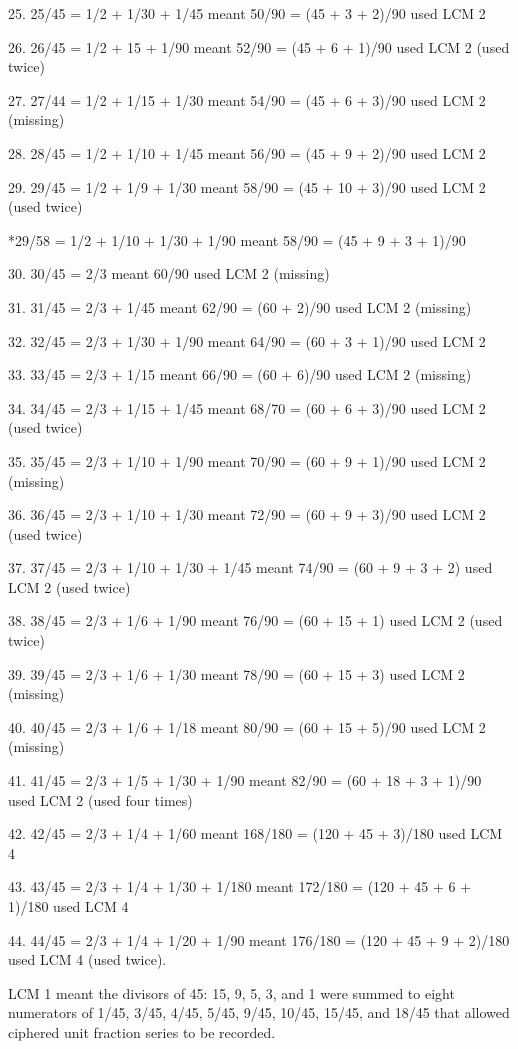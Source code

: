 \documentclass[12pt]{article}
\begin{document}
25. 25/45 = 1/2 + 1/30 + 1/45 meant 50/90 = (45 + 3 + 2)/90 used LCM 2

26. 26/45 = 1/2 + 15 + 1/90 meant 52/90 = (45 + 6 + 1)/90 used LCM 2 (used twice)

27. 27/44 = 1/2 + 1/15 + 1/30 meant 54/90 = (45 + 6 + 3)/90 used LCM 2 (missing)

28. 28/45  = 1/2 + 1/10 + 1/45 meant 56/90 = (45 + 9 + 2)/90 used LCM 2

29. 29/45 = 1/2 + 1/9 + 1/30 meant 58/90 = (45 + 10 + 3)/90 used LCM 2 (used twice)

*29/58 = 1/2 + 1/10 + 1/30 + 1/90 meant 58/90 = (45 + 9 + 3 + 1)/90

30. 30/45 = 2/3 meant 60/90 used LCM 2  (missing)

31. 31/45 = 2/3 + 1/45 meant 62/90 = (60 + 2)/90 used LCM 2 (missing)

32. 32/45 = 2/3 + 1/30 + 1/90 meant 64/90 = (60 + 3 + 1)/90 used LCM 2

33. 33/45 = 2/3 + 1/15  meant 66/90 = (60 + 6)/90 used LCM 2 (missing)

34. 34/45 = 2/3 + 1/15 + 1/45 meant 68/70 = (60 + 6 + 3)/90 used LCM 2 (used twice) 

35. 35/45 = 2/3 + 1/10 + 1/90 meant 70/90 = (60 + 9 + 1)/90 used LCM 2 (missing)

36. 36/45 = 2/3 + 1/10 + 1/30 meant 72/90 = (60 + 9 + 3)/90 used LCM 2 (used twice)

37. 37/45 = 2/3 + 1/10 + 1/30 + 1/45 meant 74/90 = (60 + 9 + 3 + 2) used LCM 2 (used twice)

38. 38/45 = 2/3 + 1/6 + 1/90 meant 76/90 = (60 + 15 + 1) used LCM 2 (used twice)

39. 39/45 = 2/3 + 1/6 + 1/30 meant 78/90 = (60 + 15 + 3) used LCM 2 (missing)

40. 40/45 = 2/3 + 1/6 + 1/18 meant 80/90 = (60 + 15 + 5)/90 used LCM 2 (missing)

41. 41/45 = 2/3 + 1/5 + 1/30 + 1/90 meant 82/90 = (60 + 18 + 3 + 1)/90 used LCM 2 (used four times) 

42. 42/45 = 2/3 + 1/4 + 1/60 meant 168/180 = (120 + 45 + 3)/180 used LCM 4 

43. 43/45 = 2/3 + 1/4 + 1/30 + 1/180 meant 172/180 = (120 + 45 + 6 + 1)/180 used LCM 4

44. 44/45 = 2/3 + 1/4 + 1/20 + 1/90 meant 176/180 = (120 + 45 + 9 + 2)/180 used LCM 4 (used twice).

LCM 1 meant the divisors of 45: 15, 9, 5, 3, and 1 were summed to eight numerators of 1/45, 3/45, 4/45, 5/45, 9/45, 10/45, 15/45, and 18/45 that allowed ciphered unit fraction series to be recorded.
\end{document}
